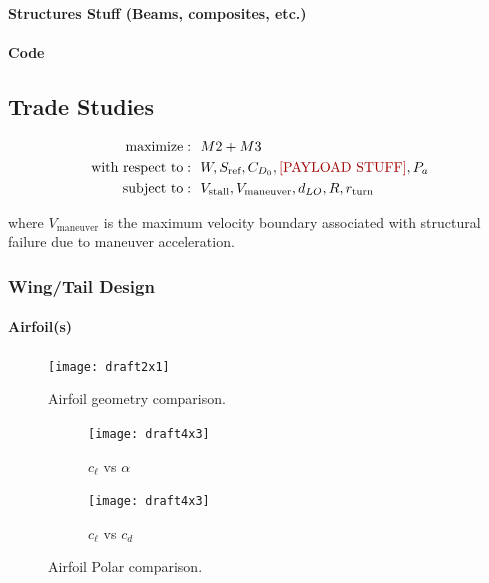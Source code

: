 \documentclass[report]{byu-aero}
\begin{document}
\paragraph{Structures Stuff (Beams, composites, etc.)}


\paragraph{Code}




\subsection{Trade Studies}
\label{ssec:tradestudies}

\begin{equation}
	\label{eqn:optdef}
	\begin{aligned}
		\text{maximize}: 
		& ~~M2 + M3 \\
		\text{with respect to}:
		& ~~W, S_\text{ref}, C_{D_0}, \text{\color{\BYUred} [PAYLOAD STUFF]}, P_a \\
		\text{subject to}: 
		& ~~V_\text{stall}, V_\text{maneuver}, d_{LO}, R, r_\text{turn}
	\end{aligned}
\end{equation}

where \(V_\text{maneuver}\) is the maximum velocity boundary associated with structural failure due to maneuver acceleration.


\subsubsection{Wing/Tail Design}

\paragraph{Airfoil(s)}

\begin{figure}[h!]
	\centering
	\texttt{[image: draft2x1]}
	\caption{Airfoil geometry comparison.}
	\label{fig:airfoilgeometrycomp}
\end{figure}

\begin{figure}[h!]
	\centering
	\begin{subfigure}[b]{0.475\textwidth}
		\texttt{[image: draft4x3]}
		\caption{\(c_\ell\) vs \(\alpha\)}
		\label{fig:clva}
	\end{subfigure}
	\begin{subfigure}[b]{0.475\textwidth}
		\texttt{[image: draft4x3]}
		\caption{\(c_\ell\) vs \(c_d\)}
		\label{fig:clvcd}
	\end{subfigure}
	\caption{Airfoil Polar comparison.}
	\label{fig:airfoilpolarcomp}
\end{figure}
\end{document}

